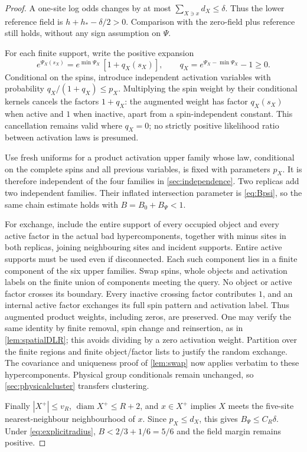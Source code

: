 \documentclass[11pt,reqno]{amsart}
\numberwithin{equation}{section}
\theoremstyle{definition}
\theoremstyle{remark}
\newcommand{\diam}{\operatorname{diam}}
\begin{document}
\begin{proof}
A one-site log odds changes by at most $\sum_{X\ni x}d_X\leq\delta$. Thus the lower reference field is $h+h_*-\delta/2>0$. Comparison with the zero-field plus reference still holds, without any sign assumption on $\Psi$.

For each finite support, write the positive expansion
\begin{equation}\label{eq:activation}
 e^{\Psi_X(s_X)}=e^{\min\Psi_X}\,[1+q_X(s_X)],\qquad
 q_X=e^{\Psi_X-\min\Psi_X}-1\geq0.
\end{equation}
Conditional on the spins, introduce independent activation variables with probability $q_X/(1+q_X)\leq p_X$. Multiplying the spin weight by their conditional kernels cancels the factors $1+q_X$: the augmented weight has factor $q_X(s_X)$ when active and $1$ when inactive, apart from a spin-independent constant. This cancellation remains valid where $q_X=0$; no strictly positive likelihood ratio between activation laws is presumed.

Use fresh uniforms for a product activation upper family whose law, conditional on the complete spins and all previous variables, is fixed with parameters $p_X$. It is therefore independent of the four families in \cref{sec:independence}. Two replicas add two independent families. Their inflated intersection parameter is \eqref{eq:Bpsi}, so the same chain estimate holds with $B=B_0+B_\Psi<1$.

For exchange, include the entire support of every occupied object and every active factor in the actual bad hypercomponents, together with minus sites in both replicas, joining neighbouring sites and incident supports. Entire active supports must be used even if disconnected. Each such component lies in a finite component of the six upper families. Swap spins, whole objects and activation labels on the finite union of components meeting the query. No object or active factor crosses its boundary. Every inactive crossing factor contributes $1$, and an internal active factor exchanges its full spin pattern and activation label. Thus augmented product weights, including zeros, are preserved. One may verify the same identity by finite removal, spin change and reinsertion, as in \cref{lem:spatialDLR}; this avoids dividing by a zero activation weight. Partition over the finite regions and finite object/factor lists to justify the random exchange. The covariance and uniqueness proof of \cref{lem:swap} now applies verbatim to these hypercomponents. Physical group conditionals remain unchanged, so \cref{sec:physicalcluster} transfers clustering.

Finally $|X^+|\leq v_R$, $\diam X^+\leq R+2$, and $x\in X^+$ implies $X$ meets the five-site nearest-neighbour neighbourhood of $x$. Since $p_X\leq d_X$, this gives $B_\Psi\leq C_R\delta$. Under \eqref{eq:explicitradius}, $B<2/3+1/6=5/6$ and the field margin remains positive.
\end{proof}
\end{document}
